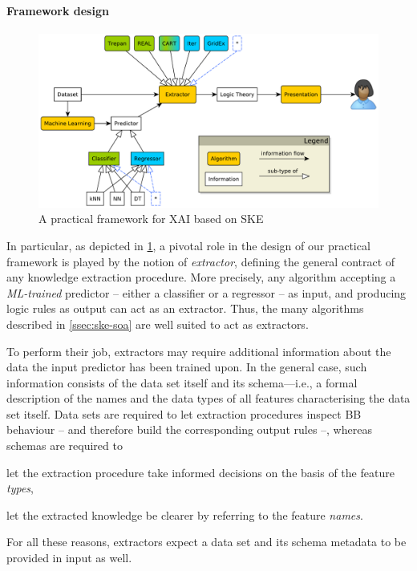 \documentclass[12pt,a4paper,openright,twoside]{book}
\begin{document}
\paragraph{Framework design}

\begin{figure}
    \centering
    \includegraphics[width=\linewidth]{figures/psyke-abstract.pdf}
    \caption{A practical framework for XAI based on SKE}
    \label{fig:psyke-abstract}
\end{figure}

In particular, as depicted in \cref{fig:psyke-abstract},  a pivotal role in the design of our practical framework is played by the notion of \emph{extractor}, defining the general contract of any knowledge extraction procedure.
%
More precisely, any algorithm accepting a \emph{ML-trained} predictor -- either a classifier or a regressor -- as input, and producing logic rules as output can act as an extractor.
%
Thus, the many algorithms described in \cref{ssec:ske-soa} are well suited to act as extractors.

To perform their job, extractors may require additional information about the data the input predictor has been trained upon.
%
In the general case, such information consists of the data set itself and its schema---i.e., a formal description of the names and the data types of all features characterising the data set itself.
%
Data sets are required to let extraction procedures inspect BB behaviour -- and therefore build the corresponding output rules --, whereas schemas are required to
%
\begin{inlinelist}
	\item let the extraction procedure take informed decisions on the basis of the feature \emph{types},
	\item let the extracted knowledge be clearer by referring to the feature \emph{names}.
\end{inlinelist}
%
For all these reasons, extractors expect a data set and its schema metadata to be provided in input as well.
\end{document}
